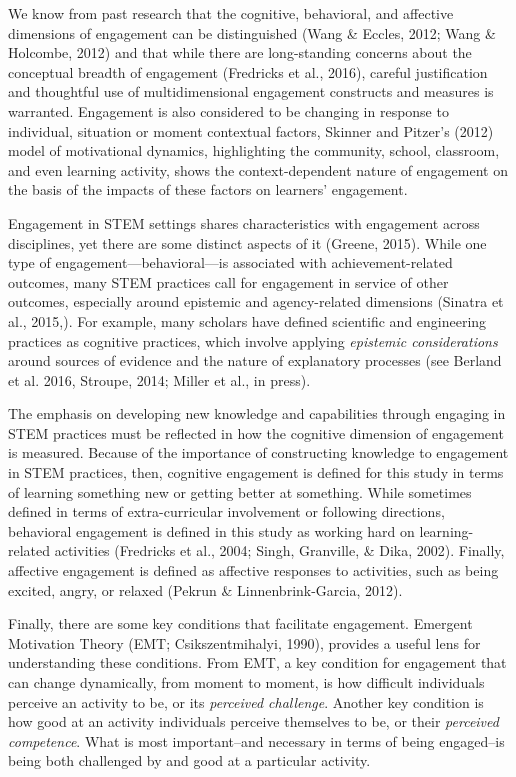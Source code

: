 \documentclass[]{msu-thesis}
\theoremstyle{definition}
\theoremstyle{definition}
\theoremstyle{definition}
\theoremstyle{remark}
\begin{document}
We know from past research that the cognitive, behavioral, and affective
dimensions of engagement can be distinguished (Wang \& Eccles, 2012;
Wang \& Holcombe, 2012) and that while there are long-standing concerns
about the conceptual breadth of engagement (Fredricks et al., 2016),
careful justification and thoughtful use of multidimensional engagement
constructs and measures is warranted. Engagement is also considered to
be changing in response to individual, situation or moment contextual
factors, Skinner and Pitzer's (2012) model of motivational dynamics,
highlighting the community, school, classroom, and even learning
activity, shows the context-dependent nature of engagement on the basis
of the impacts of these factors on learners' engagement.

Engagement in STEM settings shares characteristics with engagement
across disciplines, yet there are some distinct aspects of it (Greene,
2015). While one type of engagement---behavioral---is associated with
achievement-related outcomes, many STEM practices call for engagement in
service of other outcomes, especially around epistemic and
agency-related dimensions (Sinatra et al., 2015,). For example, many
scholars have defined scientific and engineering practices as cognitive
practices, which involve applying \emph{epistemic considerations} around
sources of evidence and the nature of explanatory processes (see Berland
et al. 2016, Stroupe, 2014; Miller et al., in press).

The emphasis on developing new knowledge and capabilities through
engaging in STEM practices must be reflected in how the cognitive
dimension of engagement is measured. Because of the importance of
constructing knowledge to engagement in STEM practices, then, cognitive
engagement is defined for this study in terms of learning something new
or getting better at something. While sometimes defined in terms of
extra-curricular involvement or following directions, behavioral
engagement is defined in this study as working hard on learning-related
activities (Fredricks et al., 2004; Singh, Granville, \& Dika, 2002).
Finally, affective engagement is defined as affective responses to
activities, such as being excited, angry, or relaxed (Pekrun \&
Linnenbrink-Garcia, 2012).

Finally, there are some key conditions that facilitate engagement.
Emergent Motivation Theory (EMT; Csikszentmihalyi, 1990), provides a
useful lens for understanding these conditions. From EMT, a key
condition for engagement that can change dynamically, from moment to
moment, is how difficult individuals perceive an activity to be, or its
\emph{perceived challenge}. Another key condition is how good at an
activity individuals perceive themselves to be, or their \emph{perceived
competence}. What is most important--and necessary in terms of being
engaged--is being both challenged by and good at a particular activity.
\end{document}
